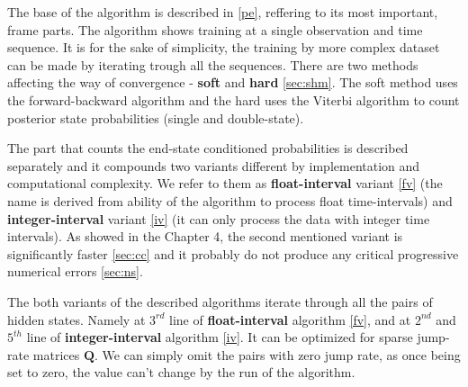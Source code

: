 \documentclass[thesis=M,english]{FITthesis}[2012/10/20]
\newcommand{\matr}[1]{\mathbf{#1}}
\begin{document}
The base of the algorithm is described in \ref{pe}, reffering to its most important, frame parts. The algorithm shows training at a single observation and time sequence. 
It is for the sake of simplicity, the training by more complex dataset can be made by iterating trough all the sequences. 
There are two methods affecting the way of convergence - \textbf{soft} and \textbf{hard} \ref{sec:shm}. 
The soft method uses the forward-backward algorithm and the hard uses the Viterbi algorithm to count posterior state probabilities (single and double-state).

The part that counts the end-state conditioned probabilities is described separately and it compounds two variants different by implementation and computational complexity. We refer to them as \textbf{float-interval} variant \ref{fv} (the name is derived from ability of the algorithm to process float time-intervals) and \textbf{integer-interval} variant \ref{iv} (it can only process the data with integer time intervals). As showed in the Chapter 4, the second mentioned variant is significantly faster \ref{sec:cc} and it probably do not produce any critical progressive numerical errors \ref{sec:ns}.

The both variants of the described algorithms iterate through all the pairs of hidden states. Namely at $3^{rd}$ line of \textbf{float-interval} algorithm \ref{fv}, and at $2^{nd}$ and $5^{th}$ line of \textbf{integer-interval} algorithm \ref{iv}. It can be optimized for sparse jump-rate matrices $\matr{Q}$. We can simply omit the pairs with zero jump rate, as once being set to zero, the value can't change by the run of the algorithm.       
\end{document}

